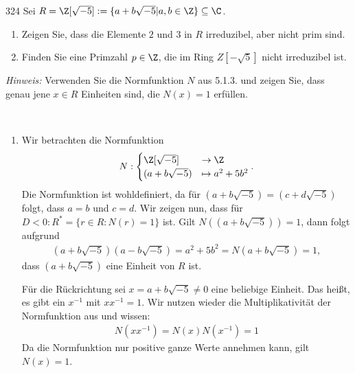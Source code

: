 \begin{algebraUE}{324}
Sei $R = \Z[\sqrt{-5}] := \{a + b\sqrt{-5} | a,b \in \Z\} \subseteq \C$.
\begin{enumerate}
  \item Zeigen Sie, dass die Elemente $2$ und $3$ in $R$ irreduzibel, aber nicht prim
  sind.
  \item Finden Sie eine Primzahl $p \in \Z$, die im Ring $Z[-\sqrt{5}]$ nicht irreduzibel ist.
\end{enumerate}
\textit{Hinweis:} Verwenden Sie die Normfunktion $N$ aus 5.1.3. und zeigen Sie,
dass genau jene $x \in R$ Einheiten sind, die $N(x) = 1$ erfüllen.
\end{algebraUE}
\begin{solution}
\leavevmode \\
\begin{enumerate}
  \item Wir betrachten die Normfunktion
  \begin{align*}
    N: \begin{cases}
      \Z[\sqrt{-5}] &\to \Z \\
      (a + b\sqrt{-5}) &\mapsto a^2 + 5b^2
    \end{cases}.
  \end{align*}
  Die Normfunktion ist wohldefiniert, da für $(a + b\sqrt{-5}) = (c + d\sqrt{-5})$
  folgt, dass $a = b$ und $c = d$.
  Wir zeigen nun, dass für $D < 0: R^* = \{r \in R: N(r) = 1\}$ ist.
  Gilt $N((a + b\sqrt{-5}) ) = 1$, dann folgt aufgrund
  \begin{align*}
    (a + b\sqrt{-5})(a - b\sqrt{-5}) = a^2 + 5b^2 = N(a + b\sqrt{-5}) = 1,
  \end{align*}
  dass $(a + b\sqrt{-5})$ eine Einheit von $R$ ist.

  Für die Rückrichtung sei $x = a + b\sqrt{-5} \neq 0$ eine beliebige Einheit. Das heißt, es gibt ein $x^{-1}$ mit $xx^{-1}=1$.
  Wir nutzen wieder die Multiplikativität der Normfunktion aus und wissen:
  \begin{align*}
    N(xx^{-1}) = N(x)N(x^{-1}) = 1
  \end{align*}
  Da die Normfunktion nur positive ganze Werte annehmen kann, gilt $N(x) = 1$.


\end{enumerate}
\end{solution}
